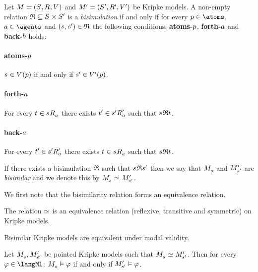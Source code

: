 \begin{definition}[Bisimulation]
Let $\kModelAndTuple$ and $\kModelAndTupleP$ be Kripke models.
A non-empty relation $\bisimulation \subseteq \kStates \times \kStatesP$ is a {\em bisimulation} if and only if for every $\atomP \in \atoms$, $\agentA \in \agents$ and $(\kStateS, \kStateSP) \in \bisimulation$ the following conditions, {\bf atoms-$p$}, {\bf forth-$a$} and {\bf back-$b$} holds:

\paragraph{atoms-$p$}
$\kStateS \in \kValuation(\atomP)$ if and only if ${{s}^{\prime}} \in {V^{\prime}}(p)$.

\paragraph{forth-$a$}
For every $\kStateT \in \kSuccessorsA{\kStateS}$ there exists ${{t}^{\prime}} \in {{{s}^{\prime}}} {R^{\prime}_{a}}$ such that $\kStateS \bisimulation \kStateT$.

\paragraph{back-$a$}
For every ${{t}^{\prime}} \in {{{s}^{\prime}}} {R^{\prime}_{a}}$ there exists $\kStateT \in \kSuccessorsA{\kStateS}$ such that $\kStateS \bisimulation \kStateT$.

If there exists a bisimulation $\mathfrak{R}$ such that $\kStateS \bisimulation \kStateSP$ then we say that $\kPModel{\kStateS}$ and ${M^{\prime}_{{{s}^{\prime}}}}$ are {\em bisimilar} and we denote this by $\kPModel{\kStateS} \bisimilar \kPModelP{\kStateSP}$.
\end{definition}

We first note that the bisimilarity relation forms an equivalence relation.

\begin{proposition}
The relation $\bisimilar$ is an equivalence relation (reflexive, transitive and symmetric) on Kripke models.
\end{proposition}

Bisimilar Kripke models are equivalent under modal validity.

\begin{proposition}\label{modal-bisimulation-invariance}
Let $\kPModel{\kStateS}, \kPModelP{\kStateSP}$ be pointed Kripke models such that $\kPModel{\kStateS} \bisimilar \kPModelP{\kStateSP}$.
Then for every $\phi \in \langMl$:
$\kPModel{\kStateS} \entails \phi$ if and only if ${M^{\prime}_{{{s}^{\prime}}}} \vDash \varphi$.
\end{proposition}

